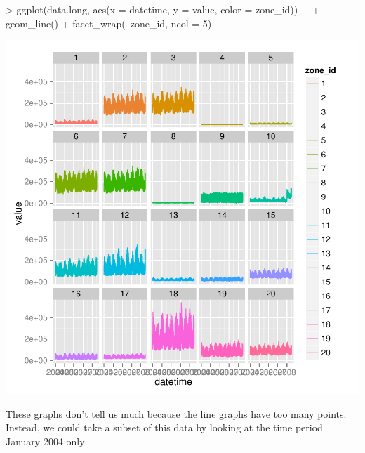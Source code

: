 \documentclass{article}
\begin{document}
\begin{Schunk}
\begin{Sinput}
> ggplot(data.long, aes(x = datetime, y = value, color = zone_id)) +
+ geom_line() + facet_wrap(~zone_id, ncol = 5)
\end{Sinput}
\end{Schunk}
\includegraphics{cookbook-041}

These graphs don't tell us much because the line graphs have too many points.
Instead, we could take a subset of this data by looking at the time period
January 2004 only
\end{document}
